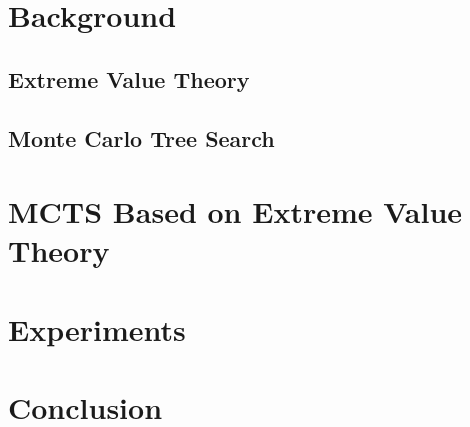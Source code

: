 \documentclass[runningheads,a4paper]{llncs}
\begin{document}
\section{Background}

\subsection{Extreme Value Theory}

\subsection{Monte Carlo Tree Search}

\section{MCTS Based on Extreme Value Theory}

\section{Experiments}

\section{Conclusion}






\end{document}
